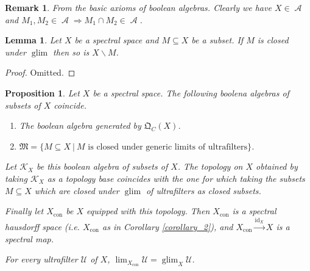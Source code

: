 \documentclass[8pt]{article}
\numberwithin{equation}{section}
\newtheorem{proposition}{Proposition}[subsection]
\newtheorem{lemma}{Lemma}[subsection]
\newtheorem{remark}{Remark}[subsection]
\DeclareMathOperator{\id}{id}
\DeclareMathOperator{\Alg}{\mathcal{A}}
\DeclareMathOperator{\glim}{glim}
\DeclareMathOperator{\con}{con}
\newcommand{\U}[0]{\mathcal{U}}
\newcommand{\sep}[0]{\:|\:}
\newcommand{\QC}[0]{\mathfrak{Q}_C}
\begin{document}
\begin{remark}
    From the basic axioms of boolean algebras. Clearly we have $X\in \Alg$ and $M_1,M_2\in\Alg\Rightarrow M_1\cap M_2\in\Alg$. 
\end{remark}
\begin{lemma}
    \label{lemma_complement_glim_stability}
    Let $X$ be a spectral space and $M\subseteq X$ be a subset. If $M$ is closed under $\glim$ then so is $X\backslash M$.
\end{lemma}
\begin{proof}
    Omitted.
\end{proof}
\begin{proposition}
    \label{proposition_5}
    Let $X$ be a spectral space. The following boolena algebras of subsets of $X$ coincide.
    \begin{enumerate}
        \item The boolean algebra generated by $\QC(X)$.
        \item $\mathfrak{M} = \{M\subseteq X\sep \text{$M$ is closed under generic limits of ultrafilters}\}$.
    \end{enumerate}
    Let $\mathcal{K}_X$ be this boolean algebra of subsets of $X$. The topology on $X$ obtained by taking $\mathcal{K}_X$ as a topology base coincides with the one for which taking the subsets $M\subseteq X$ which are closed under $\glim$ of ultrafilters as closed subsets.
    \par Finally let $X_{\con}$ be $X$ equipped with this topology. Then $X_{\con}$ is a spectral hausdorff space (i.e. $X_{\con}$ as in Corollary \ref{corollary_2}), and $X_{\con}\stackrel{\id_X}{\to}X$ is a spectral map.
    \par For every ultrafilter $\U$ of $X$, $\lim_{X_{\con}}\U=\glim_X\U$. 
\end{proposition}
\end{document}
